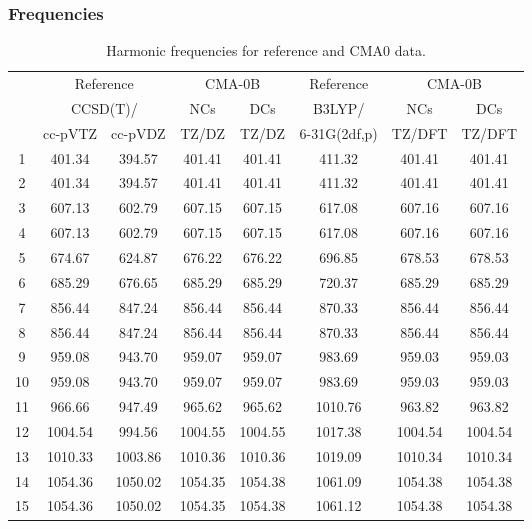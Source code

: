 \documentclass[10pt,oneside]{article}
\begin{document}
\subsubsection*{Frequencies}
\begin{table}[h!]
\centering
\caption{Harmonic frequencies for reference and CMA0 data.}
\begin{tabular}{cccccccc}
\toprule
{} & \multicolumn{2}{c}{Reference} & \multicolumn{2}{c}{CMA-0B} &    Reference & \multicolumn{2}{c}{CMA-0B} \\
{} & \multicolumn{2}{c}{CCSD(T)/} &     NCs &     DCs &       B3LYP/ &     NCs &     DCs \\
{} &   cc-pVTZ & cc-pVDZ &   TZ/DZ &   TZ/DZ & 6-31G(2df,p) &  TZ/DFT &  TZ/DFT \\
\midrule
1  &    401.34 &  394.57 &  401.41 &  401.41 &       411.32 &  401.41 &  401.41 \\
2  &    401.34 &  394.57 &  401.41 &  401.41 &       411.32 &  401.41 &  401.41 \\
3  &    607.13 &  602.79 &  607.15 &  607.15 &       617.08 &  607.16 &  607.16 \\
4  &    607.13 &  602.79 &  607.15 &  607.15 &       617.08 &  607.16 &  607.16 \\
5  &    674.67 &  624.87 &  676.22 &  676.22 &       696.85 &  678.53 &  678.53 \\
6  &    685.29 &  676.65 &  685.29 &  685.29 &       720.37 &  685.29 &  685.29 \\
7  &    856.44 &  847.24 &  856.44 &  856.44 &       870.33 &  856.44 &  856.44 \\
8  &    856.44 &  847.24 &  856.44 &  856.44 &       870.33 &  856.44 &  856.44 \\
9  &    959.08 &  943.70 &  959.07 &  959.07 &       983.69 &  959.03 &  959.03 \\
10 &    959.08 &  943.70 &  959.07 &  959.07 &       983.69 &  959.03 &  959.03 \\
11 &    966.66 &  947.49 &  965.62 &  965.62 &      1010.76 &  963.82 &  963.82 \\
12 &   1004.54 &  994.56 & 1004.55 & 1004.55 &      1017.38 & 1004.54 & 1004.54 \\
13 &   1010.33 & 1003.86 & 1010.36 & 1010.36 &      1019.09 & 1010.34 & 1010.34 \\
14 &   1054.36 & 1050.02 & 1054.35 & 1054.38 &      1061.09 & 1054.38 & 1054.38 \\
15 &   1054.36 & 1050.02 & 1054.35 & 1054.38 &      1061.12 & 1054.38 & 1054.38 \\

\end{tabular}
\end{table}
\end{document}
